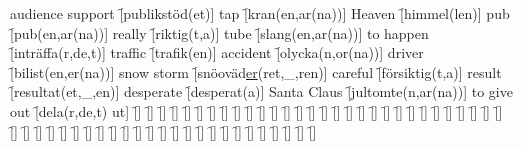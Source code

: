 \begin{questions}
\begin{multicols}{2}
        \question audience support \f[publikstöd(et)]
        \question tap \f[kran(en,ar(na))]
        \question Heaven \f[himmel(len)]
        \question pub \f[pub(en,ar(na))]
        \question really \f[riktig(t,a)]
        \question tube \f[slang(en,ar(na))]
        \question to happen \f[inträffa(r,de,t)]
        \question traffic \f[trafik(en)]
        \question accident \f[olycka(n,or(na))]
        \question driver \f[bilist(en,er(na))]
        \question snow storm \f[snöoväd\underline{er}(ret,\_,ren)]
        \question careful \f[försiktig(t,a)]
        \question result \f[resultat(et,\_,en)]
        \question desperate \f[desperat(a)]
        \question Santa Claus \f[jultomte(n,ar(na))]
        \question to give out \f[dela(r,de,t) ut]
        \question  \f[]
        \question  \f[]
        \question  \f[]
        \question  \f[]
        \question  \f[]
        \question  \f[]
        \question  \f[]
        \question  \f[]
        \question  \f[]
        \question  \f[]
        \question  \f[]
        \question  \f[]
        \question  \f[]
        \question  \f[]
        \question  \f[]
        \question  \f[]
        \question  \f[]
        \question  \f[]
        \question  \f[]
        \question  \f[]
        \question  \f[]
        \question  \f[]
        \question  \f[]
        \question  \f[]
        \question  \f[]
        \question  \f[]
        \question  \f[]
        \question  \f[]
        \question  \f[]
        \question  \f[]
        \question  \f[]
        \question  \f[]
        \question  \f[]
        \question  \f[]
        \question  \f[]
        \question  \f[]
        \question  \f[]
        \question  \f[]
        \question  \f[]
        \question  \f[]
        \question  \f[]
        \question  \f[]
        \question  \f[]
        \question  \f[]
        \question  \f[]
        \question  \f[]
        \question  \f[]
        \question  \f[]
        \question  \f[]
        \question  \f[]
        \question  \f[]
        \question  \f[]
        \question  \f[]
        \question  \f[]
        \question  \f[]
    \end{multicols}
\end{questions}
